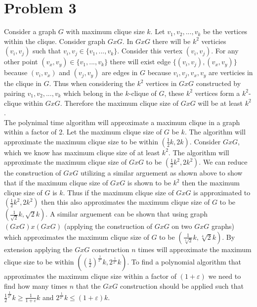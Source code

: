 \documentclass[11pt]{article}
\begin{document}
\section*{Problem 3}
Consider a graph $G$ with maximum clique size $k$. Let $v_1, v_2, ..., v_k$ be the vertices within the clique. Consider graph $GxG$. In $GxG$ there will be $k^2$ verticies $(v_i,v_j)$ such that $v_i, v_j \in \{v_1, ..., v_k\}$. Consider this vertex $(v_i,v_j)$. For any other point $(v_x, v_y) \in \{v_1, ..., v_k\}$ there will exist edge $\{(v_i,v_j),(v_x,v_y)\}$ because $(v_i,v_x)$ and $(v_j,v_y)$ are edges in $G$ because $v_i,v_j,v_x,v_y$ are verticies in the clique in $G$. Thus when considering the $k^2$ vertices in $GxG$ constructed by pairing $v_1, v_2, ..., v_k$ which belong in the $k$-clique of $G$, these $k^2$ vertices form a $k^2$-clique within $GxG$. Therefore the maximum clique size of $GxG$ will be at least $k^2$.\\

The polynimal time algorithm will approximate a maximum clique in a graph within a factor of 2. Let the maximum clique size of $G$ be $k$. The algorithm will approximate the maximum clique size to be within $(\frac{1}{2}k, 2k)$. Consider $GxG$, which we know has maximum clique size of at least $k^2$. The algorithm will approximate the maximum clique size of $GxG$ to be $(\frac{1}{2}k^2, 2k^2)$. We can reduce the construction of $GxG$ utilizing a similar arguement as shown above to show that if the maximum clique size of $GxG$ is shown to be $k^2$ then the maximum clique size of $G$ is $k$. Thus if the maximum clique size of $GxG$ is approximated to $(\frac{1}{2}k^2, 2k^2)$ then this also approximates the maximum clique size of $G$ to be $(\frac{1}{\sqrt{2}}k, \sqrt{2}k)$. A similar arguement can be shown that using graph $(GxG)x(GxG)$ (applying the construction of $GxG$ on two $GxG$ graphs) which approximates the maximum clique size of $G$ to be $(\frac{1}{\sqrt[4]{2}}k, \sqrt[4]{2}k)$. By extension applying the $GxG$ construction $n$ times will approximate the maximum clique size to be within $((\frac{1}{2})^{\frac{1}{2^n}}k, 2^{\frac{1}{2^n}}k)$. To find a polynomial algorithm that approximates the maximum clique size within a factor of $(1+\varepsilon)$ we need to find how many times $n$ that the $GxG$ construction should be applied such that $\frac{1}{2}^{\frac{1}{2^n}}k \geq \frac{1}{1+\varepsilon}k$ and $2^{\frac{1}{2^n}}k \leq (1+\varepsilon)k$.\\
\end{document}
